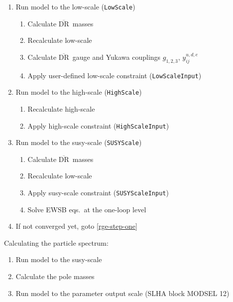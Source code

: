 \documentclass[final,3p,times,pdflatex]{elsarticle}
\newcommand{\code}[1]{\lstinline|#1|}  %
\newcommand{\textoverline}[1]{$\overline{\mbox{#1}}$}
\newcommand{\DRbar}{\textoverline{DR}\xspace}
\begin{document}
\begin{enumerate}
\item \label{rge-step-one} Run model to the low-scale (\code{LowScale})
  \begin{enumerate}
  \item Calculate \DRbar\ masses
  \item Recalculate low-scale
  \item Calculate \DRbar\ gauge and Yukawa couplings $g_{1,2,3}$, $y^{u,d,e}_{ij}$
  \item Apply user-defined low-scale constraint (\code{LowScaleInput})
  \end{enumerate}
\item Run model to the high-scale (\code{HighScale})
  \begin{enumerate}
  \item Recalculate high-scale
  \item Apply high-scale constraint (\code{HighScaleInput})
  \end{enumerate}
\item Run model to the susy-scale (\code{SUSYScale})
  \begin{enumerate}
  \item Calculate \DRbar\ masses
  \item Recalculate low-scale
  \item Apply susy-scale constraint (\code{SUSYScaleInput})
  \item Solve EWSB eqs.\ at the one-loop level
  \end{enumerate}
\item If not converged yet, goto \ref{rge-step-one}
\end{enumerate}
%
Calculating the particle spectrum:
\begin{enumerate}
\item Run model to the susy-scale
\item Calculate the pole masses
\item Run model to the parameter output scale (SLHA block MODSEL 12)
\end{enumerate}
\end{document}

